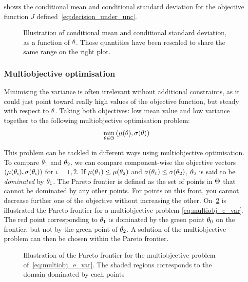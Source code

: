 \documentclass[../../Main_ManuscritThese.tex]{subfiles}
\newcommand\imgpath{/home/victor/acadwriting/Manuscrit/Text/Chapter3/img/}
\begin{document}
 shows the conditional mean and conditional
standard deviation for the objective function $J$
defined~\cref{eq:decision_under_unc}.
\begin{figure}[ht]
  \centering
  
  \caption[Conditional mean and standard deviation]{Illustration of
    conditional mean and conditional standard deviation, as a function
    of $\theta$. Those quantities have been rescaled to share the same
    range on the right plot.}
  \label{fig:mean_std} 
\end{figure}

\subsubsection{Multiobjective optimisation}
\label{sec:multiobjective_optimization}
Minimising the variance is often irrelevant without additional
constraints, as it could just point toward really high values of the
objective function, but steady with respect to $\theta$. Taking both
objectives: low mean value and low variance together to the following
multiobjective optimisation problem:
\begin{align}
  \label{eq:multiobj_e_var}
  \min_{\theta\in\Theta} \left(\mu(\theta),\sigma(\theta)\right)
\end{align}


This problem can be tackled in different ways using multiobjective optimisation.
To compare $\theta_1$ and $\theta_2$, we can compare component-wise the
objective vectors $(\mu(\theta_i),\sigma(\theta_i))$ for $i=1,2$. If
$\mu(\theta_1) \leq \mu(\theta_2)$ and $\sigma(\theta_1) \leq \sigma(\theta_2)$,
$\theta_2$ is said to be \emph{dominated} by $\theta_1$. The Pareto frontier
is defined as the set of points in $\Theta$ that cannot be dominated
by any other points. For points on this front, you cannot decrease
further one of the objective without increasing the other.
On~\cref{fig:pareto} is illustrated the Pareto frontier for a
multiobjective problem \cref{eq:multiobj_e_var}. The red point
corresponding to $\theta_1$ is dominated by the green point $\theta_0$ on
the frontier, but not by the green point of $\theta_2$. A solution of the
multiobjective problem can then be chosen within the Pareto frontier.

\begin{figure}[ht]
  \centering
  
  \caption[Pareto frontier]{\label{fig:pareto} 
 Illustration of the Pareto frontier for the multiobjective problem of~\cref{eq:multiobj_e_var}. The shaded regions corresponds to the domain dominated by each points}
\end{figure}
\end{document}
